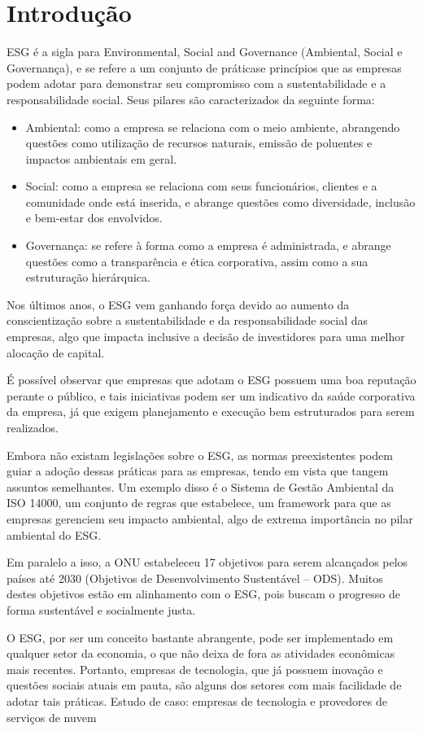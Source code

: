 \documentclass{article}
\begin{document}
	\section*{Introdução}
	ESG é a sigla para Environmental, Social and Governance (Ambiental, Social e Governança), e se refere a um conjunto de práticase princípios que as empresas podem adotar para demonstrar seu compromisso com a sustentabilidade e a responsabilidade social. Seus pilares são caracterizados da seguinte forma:
	\begin{itemize}
		\item Ambiental: como a empresa se relaciona com o meio ambiente, abrangendo questões como utilização de recursos naturais, emissão de poluentes e impactos ambientais em geral.
		\item Social: como a empresa se relaciona com seus funcionários, clientes e a comunidade onde está inserida, e abrange questões como diversidade, inclusão e bem-estar dos envolvidos.
		\item Governança: se refere à forma como a empresa é administrada, e abrange questões como a transparência e ética corporativa, assim como a sua estruturação hierárquica.
	\end{itemize}
	Nos últimos anos, o ESG vem ganhando força devido ao aumento da conscientização sobre a sustentabilidade e da responsabilidade social das empresas, algo que impacta inclusive a decisão de investidores para uma melhor alocação de capital.
	
	É possível observar que empresas que adotam o ESG possuem uma boa reputação perante o público, e tais iniciativas podem ser um indicativo da saúde corporativa da empresa, já que exigem planejamento e execução bem estruturados para serem realizados.
	
	Embora não existam legislações sobre o ESG, as normas preexistentes podem guiar a adoção dessas práticas para as empresas, tendo em vista que tangem assuntos semelhantes. Um exemplo disso é o Sistema de Gestão Ambiental da ISO 14000, um conjunto de regras que estabelece, um framework para que as empresas gerenciem seu impacto ambiental, algo de extrema importância no pilar ambiental do ESG.
	
	Em paralelo a isso, a ONU estabeleceu 17 objetivos para serem alcançados pelos países até 2030 (Objetivos de Desenvolvimento Sustentável – ODS). Muitos destes objetivos estão em alinhamento com o ESG, pois buscam o progresso de forma sustentável e socialmente justa.
	
	O ESG, por ser um conceito bastante abrangente, pode ser implementado em qualquer setor da economia, o que não deixa de fora as atividades econômicas mais recentes. Portanto, empresas de tecnologia, que já possuem inovação e questões sociais atuais em pauta, são alguns dos setores com mais facilidade de adotar tais práticas.
	Estudo de caso: empresas de tecnologia e provedores de serviços de nuvem
	
\end{document}
